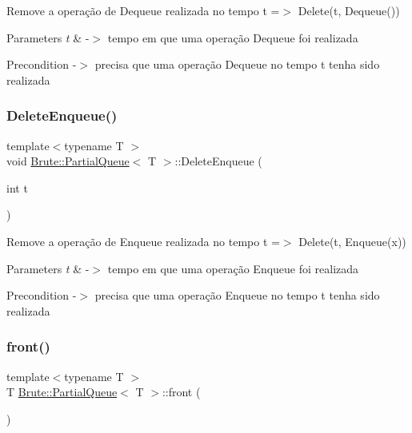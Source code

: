 Remove a operação de Dequeue realizada no tempo t =$>$ Delete(t, Dequeue())


\begin{DoxyParams}{Parameters}
{\em t} & -\/$>$ tempo em que uma operação Dequeue foi realizada \\
\hline
\end{DoxyParams}
\begin{DoxyPrecond}{Precondition}
-\/$>$ precisa que uma operação Dequeue no tempo t tenha sido realizada 
\end{DoxyPrecond}
\mbox{\label{classBrute_1_1PartialQueue_a4541c69cc2624fb28ffadd1f1cfc84e9}} 
\subsubsection{\texorpdfstring{Delete\+Enqueue()}{DeleteEnqueue()}}
{\footnotesize\ttfamily template$<$typename T $>$ \\
void \hyperlink{classBrute_1_1PartialQueue}{Brute\+::\+Partial\+Queue}$<$ T $>$\+::Delete\+Enqueue (\begin{DoxyParamCaption}\item[{int}]{t }\end{DoxyParamCaption})}

Remove a operação de Enqueue realizada no tempo t =$>$ Delete(t, Enqueue(x))


\begin{DoxyParams}{Parameters}
{\em t} & -\/$>$ tempo em que uma operação Enqueue foi realizada \\
\hline
\end{DoxyParams}
\begin{DoxyPrecond}{Precondition}
-\/$>$ precisa que uma operação Enqueue no tempo t tenha sido realizada 
\end{DoxyPrecond}
\mbox{\label{classBrute_1_1PartialQueue_ab90169266f018db61fa665d8cfba2e85}} 
\subsubsection{\texorpdfstring{front()}{front()}}
{\footnotesize\ttfamily template$<$typename T $>$ \\
T \hyperlink{classBrute_1_1PartialQueue}{Brute\+::\+Partial\+Queue}$<$ T $>$\+::front (\begin{DoxyParamCaption}{ }\end{DoxyParamCaption})}

